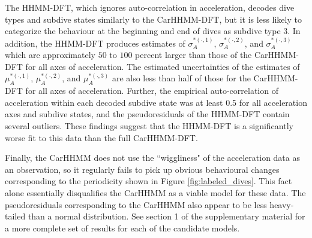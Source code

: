 The HHMM-DFT, which ignores auto-correlation in acceleration, decodes dive types and subdive states similarly to the CarHHMM-DFT, but it is less likely to categorize the behaviour at the beginning and end of dives as subdive type 3. In addition, the HHMM-DFT produces estimates of $\sigma_A^{*(\cdot,1)}$, $\sigma_A^{*(\cdot,2)}$, and $\sigma_A^{*(\cdot,3)}$ which are approximately $50$ to $100$ percent larger than those of the CarHHMM-DFT for all axes of acceleration. The estimated uncertainties of the estimates of $\mu_A^{*(\cdot,1)}$, $\mu_A^{*(\cdot,2)}$, and $\mu_A^{*(\cdot,3)}$ are also less than half of those for the CarHHMM-DFT for all axes of acceleration. Further, the empirical auto-correlation of acceleration within each decoded subdive state was at least 0.5 for all acceleration axes and subdive states, and the pseudoresiduals of the HHMM-DFT contain several outliers. These findings suggest that the HHMM-DFT is a significantly worse fit to this data than the full CarHHMM-DFT.

Finally, the CarHHMM does not use the ``wiggliness" of the acceleration data as an observation, so it regularly fails to pick up obvious behavioural changes corresponding to the periodicity shown in Figure \ref{fig:labeled_dives}. This fact alone essentially disqualifies the CarHHMM as a viable model for these data. The pseudoresiduals corresponding to the CarHHMM also appear to be less heavy-tailed than a normal distribution. See section 1 of the supplementary material for a more complete set of results for each of the candidate models.
